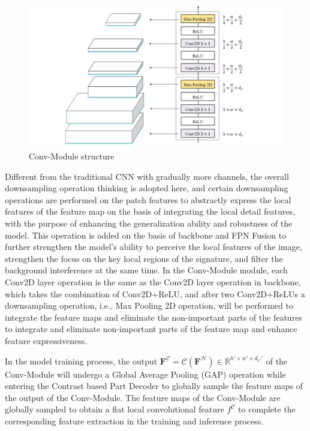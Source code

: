 \begin{figure}[H]
  \begin{center}
      \includegraphics[scale=0.42]{figure/conv.png}
  \end{center}
  \caption{Conv-Module structure}
  \label{fig:conv}
\end{figure}

Different from the traditional CNN with gradually more channels, the overall downsampling operation thinking is adopted here, and certain downsampling operations are performed on the patch features to abstractly express the local features of the feature map on the basis of integrating the local detail features, with the purpose of enhancing the generalization ability and robustness of the model. This operation is added on the basis of backbone and FPN Fusion to further strengthen the model's ability to perceive the local features of the image, strengthen the focus on the key local regions of the signature, and filter the background interference at the same time. In the Conv-Module module, each Conv2D layer operation is the same as the Conv2D layer operation in backbone, which takes the combination of Conv2D+ReLU, and after two Conv2D+ReLUs a downsampling operation, i.e., Max Pooling 2D operation, will be performed to integrate the feature maps and eliminate the non-important parts of the features to integrate and eliminate non-important parts of the feature map and enhance feature expressiveness.

In the model training process, the output $\mathbf{F}^\mathcal{C} = \mathcal{C}(\mathbf{F}^\mathcal{H} ) \in \mathbb{R}^{h'\times w'\times d_C' }$ of the Conv-Module will undergo a Global Average Pooling (GAP) operation while entering the Contrast based Part Decoder to globally sample the feature maps of the output of the Conv-Module. The feature maps of the Conv-Module are globally sampled to obtain a flat local convolutional feature $f^\mathcal{C}$ to complete the corresponding feature extraction in the training and inference process.


